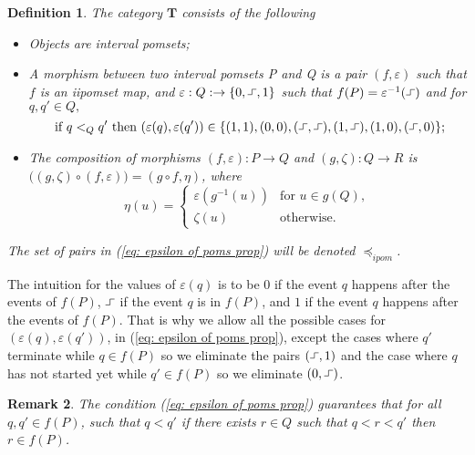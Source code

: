 \documentclass[11pt,a4paper,oldfontcommands]{memoir}
\newcommand*{\intpom}{\TrO}
\newcommand{\TrO}{\mathbf{T}}
\newcommand*\exec{%
  \raisebox{1pt}{%
    \begin{tikzpicture}[x=.8ex,y=1ex,-]
      \draw (0,0) -- (1,0) -- (1,1) -- (2,1);
    \end{tikzpicture}}}
\newtheorem{definition}{Definition}
\newtheorem{remark}[definition]{Remark}
\begin{document}
\begin{definition} \label{def: inP category}
    The category $\intpom$ consists of the following
    \begin{itemize}
        \item Objects are interval pomsets;
        \item A morphism between two interval pomsets P and Q is a pair $(f,\varepsilon)$ such that $f$ is an iipomset map, and $\varepsilon: Q: \rightarrow \{ 0,\exec,1 \}$ such that $f(P)=\varepsilon^{-1}(\exec)$ and for $q,q' \in Q,$
        \begin{equation}\label{eq: epsilon of poms prop}
         \text{ if } q <_Q q' \text{ then } (\varepsilon(q),\varepsilon(q'))\in \{ (1,1),(0,0),(\exec,\exec),(1,\exec),(1,0),(\exec,0)  \};    
        \end{equation} 
        \item  The composition of morphisms $(f,\varepsilon):P\to Q$ and
    $(g,\zeta):Q\to R$ is $\bigl( (g,\zeta) \circ (f,\varepsilon) \bigl)=(g\circ f,\eta)$, where
    \begin{equation*}
      \eta(u)=
      \begin{cases}
        \varepsilon(g^{-1}(u)) & \text{for $u\in g(Q)$}, \\
        \zeta(u) & \text{otherwise}.
      \end{cases}
    \end{equation*}
    \end{itemize}
     The set of pairs in (\ref{eq: epsilon of poms prop}) will be denoted ${\preceq_{ipom}}$. 
\end{definition}
The intuition for the values of $\varepsilon(q)$ is to be $0$ if the event $q$ happens after the events of $f(P)$, $\exec$ if the event $q$ is in $f(P)$, and $1$ if the event $q$ happens after the events of $f(P)$.
That is why we allow all the possible cases for $(\varepsilon(q),\varepsilon(q'))$, in (\ref{eq: epsilon of poms prop}), except the cases where $q'$ terminate while $q \in f(P)$ so we eliminate the pairs $(\exec,1)$ and the case where $q$ has not started yet while $q'\in f(P)$ so we eliminate $(0,\exec)$.
\begin{remark}
    The condition (\ref{eq: epsilon of poms prop}) guarantees that for all $q,q' \in f(P)$, such that $q<q'$ if there exists $r \in Q$ such that $q<r<q'$ then $r\in f(P)$. %
\end{remark}
\end{document}
